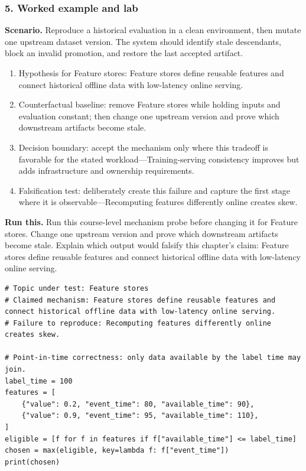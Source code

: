 \subsubsection*{5. Worked example and lab}
\textbf{Scenario.} Reproduce a historical evaluation in a clean environment, then mutate one upstream dataset version. The system should identify stale descendants, block an invalid promotion, and restore the last accepted artifact.
\begin{enumerate}
\item Hypothesis for Feature stores: Feature stores define reusable features and connect historical offline data with low-latency online serving.
\item Counterfactual baseline: remove Feature stores while holding inputs and evaluation constant; then change one upstream version and prove which downstream artifacts become stale.
\item Decision boundary: accept the mechanism only where this tradeoff is favorable for the stated workload—Training-serving consistency improves but adds infrastructure and ownership requirements.
\item Falsification test: deliberately create this failure and capture the first stage where it is observable—Recomputing features differently online creates skew.
\end{enumerate}
\textbf{Run this.} Run this course-level mechanism probe before changing it for Feature stores. Change one upstream version and prove which downstream artifacts become stale. Explain which output would falsify this chapter's claim: Feature stores define reusable features and connect historical offline data with low-latency online serving.
\begin{Verbatim}[fontsize=\scriptsize]
# Topic under test: Feature stores
# Claimed mechanism: Feature stores define reusable features and connect historical offline data with low-latency online serving.
# Failure to reproduce: Recomputing features differently online creates skew.

# Point-in-time correctness: only data available by the label time may join.
label_time = 100
features = [
    {"value": 0.2, "event_time": 80, "available_time": 90},
    {"value": 0.9, "event_time": 95, "available_time": 110},
]
eligible = [f for f in features if f["available_time"] <= label_time]
chosen = max(eligible, key=lambda f: f["event_time"])
print(chosen)
\end{Verbatim}
